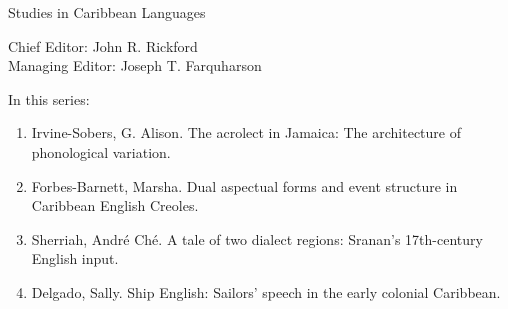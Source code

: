 {\large Studies in Caribbean Languages}

\bigskip

Chief Editor: John R. Rickford\\
Managing Editor: Joseph T. Farquharson

\bigskip

In this series:

\begin{enumerate}
\item Irvine-Sobers,  G. Alison. The acrolect in Jamaica: The architecture of phonological variation.
\item Forbes-Barnett, Marsha. Dual aspectual forms and event structure in Caribbean English Creoles.
\item Sherriah, André Ché. A tale of two dialect regions: Sranan’s 17th-century English input.
\item Delgado, Sally.  Ship English: Sailors’ speech in the early colonial Caribbean.
\end{enumerate}


\vfill

